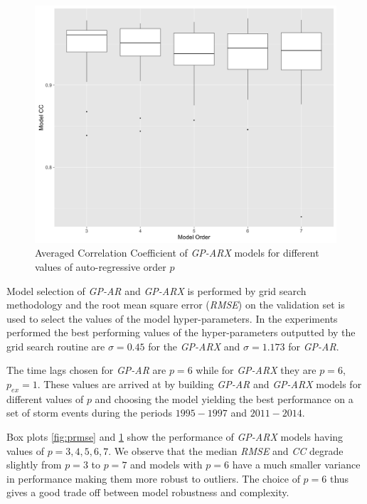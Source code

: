 \documentclass[referee,a4paper,12pt,traditabstract]{swsc}
\begin{document}
\begin{linenumbers}
\begin{figure}
   \centering
   \includegraphics[width=\textwidth]{Model_corr_validationStorms}
      \caption{Averaged Correlation Coefficient of \emph{GP-ARX} models for different values of auto-regressive order $p$}
         \label{fig:pcorr}
 \end{figure}

Model selection of \emph{GP-AR} and \emph{GP-ARX} is performed by grid search methodology and the root mean square error (\emph{RMSE}) on the validation set is used to select the values of the model hyper-parameters. In the experiments performed the best performing values of the hyper-parameters outputted by the grid search routine are $\sigma = 0.45$ for the \emph{GP-ARX} and $\sigma = 1.173$ for \emph{GP-AR}. 

The time lags chosen for \emph{GP-AR} are $p = 6$ while for \emph{GP-ARX} they are $p=6$, $p_{ex} = 1$. These values are arrived at by building \emph{GP-AR} and \emph{GP-ARX} models for different values of $p$ and choosing the model yielding the best performance on a set of storm events during the periods $1995-1997$ and $2011-2014$. 

Box plots \ref{fig:prmse} and \ref{fig:pcorr} show the performance of \emph{GP-ARX} models having values of $p={3,4,5,6,7}$. We observe that the median \emph{RMSE} and \emph{CC} degrade slightly from $p = 3$ to $p = 7$ and models with $p = 6$ have a much smaller variance in performance making them more robust to outliers. The choice of $p = 6$ thus gives a good trade off between model robustness and complexity. 


\end{linenumbers}
\end{document}
